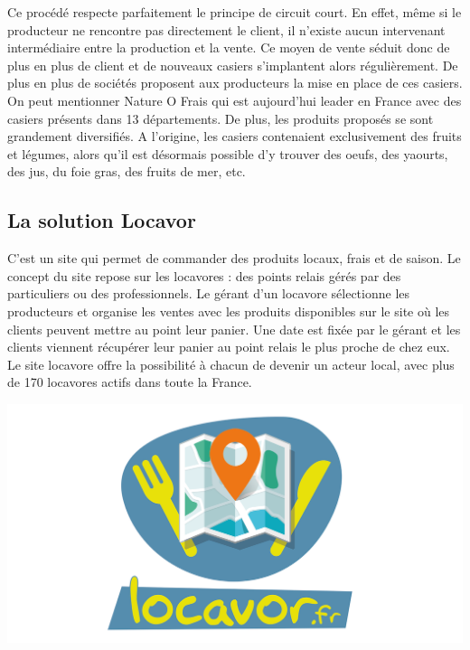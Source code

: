 \documentclass[11pt]{article}
\begin{document}
Ce procédé respecte parfaitement le principe de circuit court. En effet, même si le producteur ne rencontre pas directement le client, il n'existe aucun intervenant intermédiaire entre la production et la vente. Ce moyen de vente séduit donc de plus en plus de client et de nouveaux casiers s'implantent alors régulièrement. De plus en plus de sociétés proposent aux producteurs la mise en place de ces casiers. On peut mentionner Nature O Frais qui est aujourd'hui leader en France avec des casiers présents dans 13 départements. De plus, les produits proposés se sont grandement diversifiés. A l'origine, les casiers contenaient exclusivement des fruits et légumes, alors qu'il est désormais possible d'y trouver des oeufs, des yaourts, des jus, du foie gras, des fruits de mer, etc.

\subsection{La solution Locavor}

\hspace{-0.6cm}\begin{minipage}{.7\textwidth}\parindent17pt
C’est un site qui permet de commander des produits locaux, frais et de saison. Le concept du site repose sur les locavores : des points relais gérés par des particuliers ou des professionnels. Le gérant d’un locavore sélectionne les producteurs et organise les ventes avec les produits disponibles sur le site où les clients peuvent mettre au point leur panier. Une date est fixée par le gérant et les clients viennent récupérer leur panier au point relais le plus proche de chez eux. Le site locavore offre la possibilité à chacun de devenir un \og acteur local\fg, avec plus de 170 locavores actifs dans toute la France. 
\end{minipage}%
\hfill
\begin{minipage}{.35\textwidth}%
\includegraphics[width=\textwidth]{locavor_logo.png}
\end{minipage}
\end{document}
